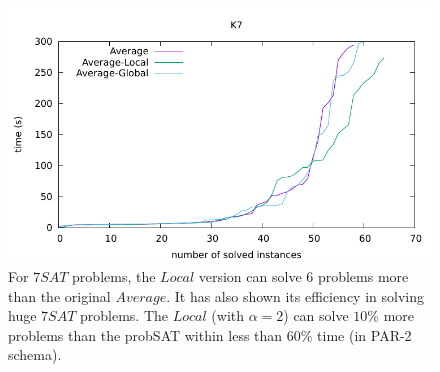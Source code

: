 \documentclass[12pt,a4paper,twoside]{scrartcl}
\numberwithin{equation}{section}
\begin{document}
  \begin{figure}[H]
\begin{center}
  \includegraphics[scale = 1]{DATA/K7/e3a.pdf}
  \end{center}
  \caption{For $7SAT$ problems, the $Local$ version can solve 6  problems more than the original $Average$. It has also shown its efficiency in solving huge $7SAT$ problems.  The $Local$ (with $\alpha = 2$) can solve $10\%$ more problems than the probSAT within less than $60\%$ time (in PAR-2 schema). }
  \label{Experiment 4 k7 cactus plot}
  \end{figure}
\end{document}
